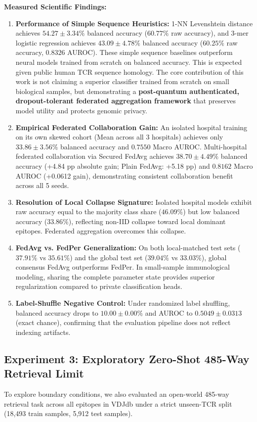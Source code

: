 \documentclass[11pt,a4paper]{article}
\begin{document}
\textbf{Measured Scientific Findings:}
\begin{enumerate}[itemsep=2pt]
  \item \textbf{Performance of Simple Sequence Heuristics:} 1-NN Levenshtein distance achieves $54.27 \pm 3.34\%$ balanced accuracy ($60.77\%$ raw accuracy), and 3-mer logistic regression achieves $43.09 \pm 4.78\%$ balanced accuracy ($60.25\%$ raw accuracy, $0.8326$ AUROC). These simple sequence baselines outperform neural models trained from scratch on balanced accuracy. This is expected given public human TCR sequence homology. The core contribution of this work is not claiming a superior classifier trained from scratch on small biological samples, but demonstrating a \textbf{post-quantum authenticated, dropout-tolerant federated aggregation framework} that preserves model utility and protects genomic privacy.
  \item \textbf{Empirical Federated Collaboration Gain:} An isolated hospital training on its own skewed cohort (Mean across all 3 hospitals) achieves only $33.86 \pm 3.56\%$ balanced accuracy and $0.7550$ Macro AUROC. Multi-hospital federated collaboration via Secured FedAvg achieves $38.70 \pm 4.49\%$ balanced accuracy (+4.84 pp absolute gain; Plain FedAvg: +5.18 pp) and $0.8162$ Macro AUROC (+0.0612 gain), demonstrating consistent collaboration benefit across all 5 seeds.
  \item \textbf{Resolution of Local Collapse Signature:} Isolated hospital models exhibit raw accuracy equal to the majority class share ($46.09\%$) but low balanced accuracy ($33.86\%$), reflecting non-IID collapse toward local dominant epitopes. Federated aggregation overcomes this collapse.
  \item \textbf{FedAvg vs. FedPer Generalization:} On both local-matched test sets ($37.91\%$ vs $35.61\%$) and the global test set ($39.04\%$ vs $33.03\%$), global consensus FedAvg outperforms FedPer. In small-sample immunological modeling, sharing the complete parameter state provides superior regularization compared to private classification heads.
  \item \textbf{Label-Shuffle Negative Control:} Under randomized label shuffling, balanced accuracy drops to $10.00 \pm 0.00\%$ and AUROC to $0.5049 \pm 0.0313$ (exact chance), confirming that the evaluation pipeline does not reflect indexing artifacts.
\end{enumerate}

\subsection{Experiment 3: Exploratory Zero-Shot 485-Way Retrieval Limit}
To explore boundary conditions, we also evaluated an open-world 485-way retrieval task across all epitopes in VDJdb under a strict unseen-TCR split (18{,}493 train samples, 5{,}912 test samples).
\end{document}
